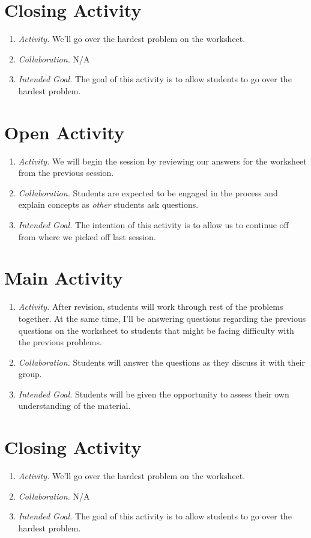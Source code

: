 \documentclass[11pt]{article}
\begin{document}
\section{\centering Closing Activity}
	\begin{enumerate}
		\item \textit{Activity.} We'll go over the hardest problem on the worksheet.
		\item \textit{Collaboration.} N/A
		\item \textit{Intended Goal.} The goal of this activity is to allow students to go over the hardest problem.
	\end{enumerate}

\newpage
{}
\section{\centering Open Activity}
	\begin{enumerate}
		\item \textit{Activity.} We will begin the session by reviewing our answers for the worksheet from the previous session.
		\item \textit{Collaboration.} Students are expected to be engaged in the process and explain concepts as \emph{other} students ask questions.
		\item \textit{Intended Goal.} The intention of this activity is to allow us to continue off from where we picked off last session.
	\end{enumerate}

\section{\centering Main Activity}
	\begin{enumerate}
		\item \textit{Activity.} After revision, students will work through rest of the problems together. At the same time, I'll be answering questions regarding
			the previous questions on the worksheet to students that might be facing difficulty with the previous problems.
		\item \textit{Collaboration.} Students will answer the questions as they discuss it with their group.
		\item \textit{Intended Goal.} Students will be given the opportunity to assess their own understanding of the material.
	\end{enumerate}
\section{\centering Closing Activity}
	\begin{enumerate}
		\item \textit{Activity.} We'll go over the hardest problem on the worksheet.
		\item \textit{Collaboration.} N/A
		\item \textit{Intended Goal.} The goal of this activity is to allow students to go over the hardest problem.
	\end{enumerate}
\end{document}
